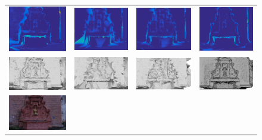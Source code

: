 \begin{figure}[t]
\setlength{\tabcolsep}{1px}
\centering
\begin{tabular}{cccc}
\includegraphics[width=0.25\columnwidth,height=0.1\textwidth]{./img/errorPoisson}&
\includegraphics[width=0.25\columnwidth,height=0.1\textwidth]{./img/errorMyFountainInit}&
\includegraphics[width=0.25\columnwidth,height=0.1\textwidth]{./img/errorMyFountainNotSm}&
\includegraphics[width=0.25\columnwidth,height=0.1\textwidth]{./img/Photofount}\\
\includegraphics[width=0.25\columnwidth,height=0.1\textwidth]{./img/poissonUntex}&
\includegraphics[width=0.25\columnwidth,height=0.1\textwidth]{./img/firstUntex}&
\includegraphics[width=0.25\columnwidth,height=0.1\textwidth]{./img/myResUntex}&
\includegraphics[width=0.25\columnwidth,height=0.1\textwidth]{./img/photo_mesh_crop}\\
\includegraphics[width=0.25\columnwidth,height=0.1\textwidth]{./img/poissonTex}&

\end{tabular}
\end{figure}
